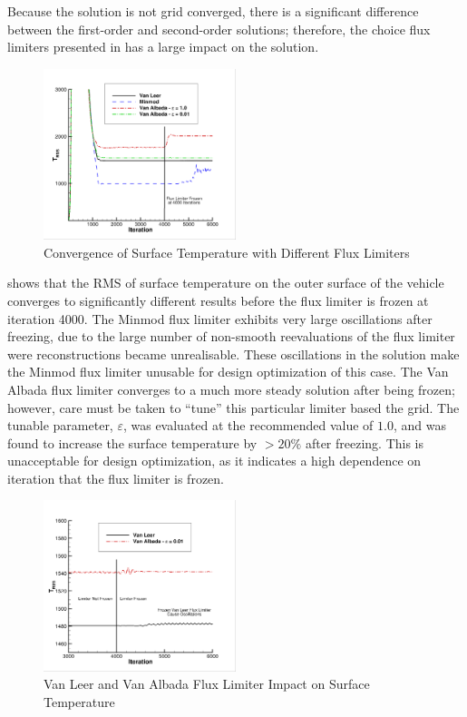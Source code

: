 Because the solution is not grid converged, there is a significant difference
between the first-order and second-order solutions; therefore, the choice flux
limiters presented in  has a large impact on
the solution.  
\begin{figure}[h]
  \centering
  \includegraphics[width=0.5\textwidth]{figures/limiters/all-limiters.png}
  \caption{Convergence of Surface Temperature with Different Flux Limiters}
  \label{fig:all-limiters}
\end{figure}
 shows that the RMS of surface temperature on the outer
surface of the vehicle converges to significantly different results before
the flux limiter is frozen at iteration 4000.  The Minmod flux limiter exhibits
very large oscillations after freezing, due to the large number of non-smooth
reevaluations of the flux limiter were reconstructions became unrealisable.
These oscillations in the solution make the Minmod flux limiter unusable for
design optimization of this case. The Van Albada flux limiter converges to a
much more steady solution after being frozen; however, care must be taken to
``tune'' this particular limiter based the grid.  The tunable parameter,
$\varepsilon$, was evaluated at the recommended value of $1.0$, and was found to
increase the surface temperature by $> 20\%$ after freezing.  This is
unacceptable for design optimization, as it indicates a high dependence on
iteration that the flux limiter is frozen.
\begin{figure}[h]
  \centering
  \includegraphics[width=0.5\textwidth]{figures/limiters/vanleer-vanalbada-frozen.png}
  \caption{Van Leer and Van Albada Flux Limiter Impact on Surface Temperature}
  \label{fig:vl-va-impact}
\end{figure}
